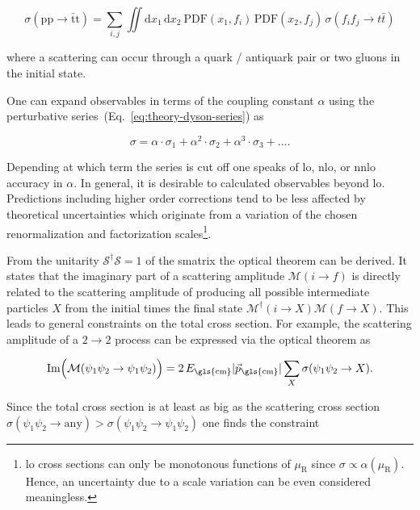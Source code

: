 \begin{equation}
\sigma(\mathrm{pp}\to \bar{\mathrm{t}}\mathrm{t})=\sum_{i,j}\iint\mathrm{d}x_{1}\,\mathrm{d}x_{2}~\mathrm{PDF}(x_{1},f_{i})\,\mathrm{PDF}(x_{2},f_{j})\,\sigma(f_{i}f_{j}\to t\bar{t})
\end{equation}

where a scattering can occur through a quark / antiquark pair or two gluons in the initial state.

One can expand observables in terms of the coupling constant $\alpha$ using the perturbative series~(Eq.~\ref{eq:theory-dyson-series}) as

\begin{equation}
\sigma=\alpha\cdot\sigma_\mathrm{1}+\alpha^{2}\cdot\sigma_{2}+\alpha^{3}\cdot\sigma_{3}+\ldots.
\end{equation}

Depending at which term the series is cut off one speaks of \gls{lo}, \gls{nlo}, or \gls{nnlo} accuracy in $\alpha$. In general, it is desirable to calculated observables beyond \gls{lo}. Predictions including higher order corrections tend to be less affected by theoretical uncertainties which originate from a variation of the chosen renormalization and factorization scales\footnote{\gls{lo} cross sections can only be monotonous functions of $\mu_\mathrm{R}$ since $\sigma\propto\alpha(\mu_\mathrm{R})$. Hence, an uncertainty due to a scale variation can be even considered meaningless.}.

From the unitarity $\mathcal{S}^{\dagger}\mathcal{S}=1$ of the \gls{smatrix} the optical theorem can be derived. It states that the imaginary part of a scattering amplitude $\mathcal{M}(i\to f)$ is directly related to the scattering amplitude of producing all possible intermediate particles $X$ from the initial times the final state $\mathcal{M}^\dagger(i\to X)\mathcal{M}(f\to X)$. This leads to general constraints on the total cross section. For example, the scattering amplitude of a $2\to2$ process can be expressed via the optical theorem as

\begin{equation}
\mathrm{Im}\Big(\mathcal{M}(\psi_{1}\psi_{2}\to\psi_{1}\psi_{2})\Big)=2\,E_\mathrm{\gls{cm}}|\vec{p}_\mathrm{\gls{cm}}|\sum_{X}\sigma(\psi_{1}\psi_{2}\to X).
\end{equation}

Since the total cross section is at least as big as the scattering cross section $\sigma(\psi_{1}\psi_{2}\to \mathrm{any})>\sigma(\psi_{1}\psi_{2}\to \psi_{1}\psi_{2})$ one finds the constraint

